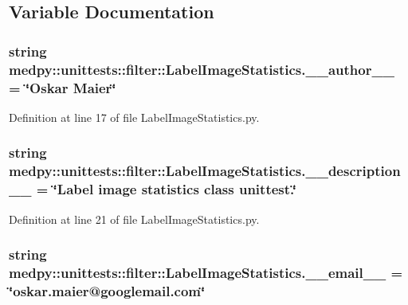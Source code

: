 \subsection{Variable Documentation}
\hypertarget{namespacemedpy_1_1unittests_1_1filter_1_1LabelImageStatistics_a678d740a8de4263209d9d1190166d5eb}{
\subsubsection[{\_\-\_\-author\_\-\_\-}]{\setlength{\rightskip}{0pt plus 5cm}string {\bf medpy::unittests::filter::LabelImageStatistics.\_\-\_\-author\_\-\_\-} = \char`\"{}Oskar Maier\char`\"{}}}
\label{namespacemedpy_1_1unittests_1_1filter_1_1LabelImageStatistics_a678d740a8de4263209d9d1190166d5eb}


Definition at line 17 of file LabelImageStatistics.py.

\hypertarget{namespacemedpy_1_1unittests_1_1filter_1_1LabelImageStatistics_a25178e0a68c8e048509a9cdc6e4b325e}{
\subsubsection[{\_\-\_\-description\_\-\_\-}]{\setlength{\rightskip}{0pt plus 5cm}string {\bf medpy::unittests::filter::LabelImageStatistics.\_\-\_\-description\_\-\_\-} = \char`\"{}Label image statistics class unittest.\char`\"{}}}
\label{namespacemedpy_1_1unittests_1_1filter_1_1LabelImageStatistics_a25178e0a68c8e048509a9cdc6e4b325e}


Definition at line 21 of file LabelImageStatistics.py.

\hypertarget{namespacemedpy_1_1unittests_1_1filter_1_1LabelImageStatistics_a46bf69d87e9dcb854475da6a7ee53399}{
\subsubsection[{\_\-\_\-email\_\-\_\-}]{\setlength{\rightskip}{0pt plus 5cm}string {\bf medpy::unittests::filter::LabelImageStatistics.\_\-\_\-email\_\-\_\-} = \char`\"{}oskar.maier@googlemail.com\char`\"{}}}
\label{namespacemedpy_1_1unittests_1_1filter_1_1LabelImageStatistics_a46bf69d87e9dcb854475da6a7ee53399}


